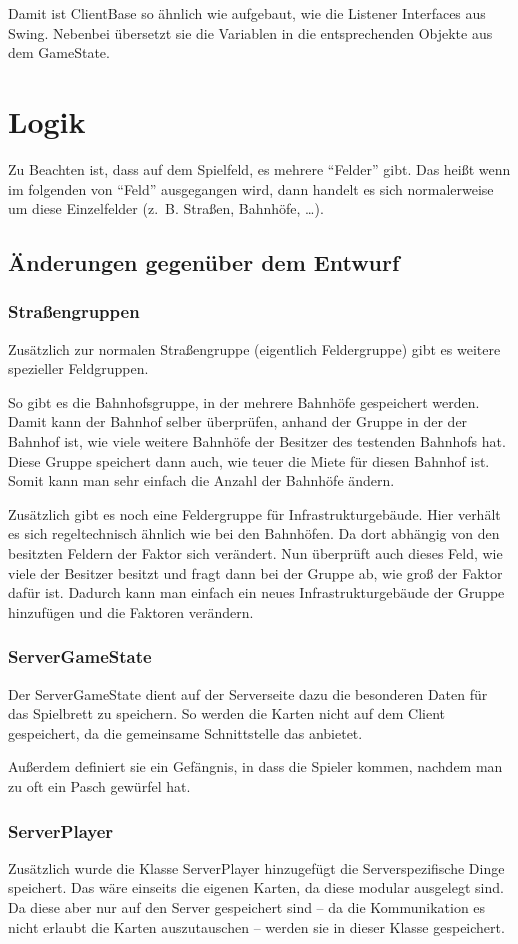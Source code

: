 \documentclass[a4paper,10pt]{article}
\begin{document}
Damit ist ClientBase so ähnlich wie aufgebaut, wie die Listener Interfaces aus Swing. Nebenbei übersetzt sie die Variablen in die entsprechenden Objekte aus dem GameState.
\newpage
\section{Logik}
Zu Beachten ist, dass auf dem Spielfeld, es mehrere ``Felder'' gibt. Das heißt wenn im folgenden von ``Feld'' ausgegangen wird, dann handelt es sich normalerweise um diese Einzelfelder (z.~B. Straßen, Bahnhöfe, \dots).
\subsection {Änderungen gegenüber dem Entwurf}
\subsubsection{Straßengruppen}
Zusätzlich zur normalen Straßengruppe (eigentlich Feldergruppe) gibt es weitere spezieller Feldgruppen.

So gibt es die Bahnhofsgruppe, in der mehrere Bahnhöfe gespeichert werden. Damit kann der Bahnhof selber überprüfen, anhand der Gruppe in der der Bahnhof ist, wie viele weitere Bahnhöfe der Besitzer des testenden Bahnhofs hat. Diese Gruppe speichert dann auch, wie teuer die Miete für diesen Bahnhof ist. Somit kann man sehr einfach die Anzahl der Bahnhöfe ändern.

Zusätzlich gibt es noch eine Feldergruppe für Infrastrukturgebäude. Hier verhält es sich regeltechnisch ähnlich wie bei den Bahnhöfen. Da dort abhängig von den besitzten Feldern der Faktor sich verändert. Nun überprüft auch dieses Feld, wie viele der Besitzer besitzt und fragt dann bei der Gruppe ab, wie groß der Faktor dafür ist. Dadurch kann man einfach ein neues Infrastrukturgebäude der Gruppe hinzufügen und die Faktoren verändern.
\subsubsection{ServerGameState}
Der ServerGameState dient auf der Serverseite dazu die besonderen Daten für das Spielbrett zu speichern. So werden die Karten nicht auf dem Client gespeichert, da die gemeinsame Schnittstelle das anbietet.

Außerdem definiert sie ein Gefängnis, in dass die Spieler kommen, nachdem man zu oft ein Pasch gewürfel hat.

\subsubsection{ServerPlayer}
Zusätzlich wurde die Klasse ServerPlayer hinzugefügt die Serverspezifische Dinge speichert. Das wäre einseits die eigenen Karten, da diese modular ausgelegt sind. Da diese aber nur auf den Server gespeichert sind -- da die Kommunikation es nicht erlaubt die Karten auszutauschen -- werden sie in dieser Klasse gespeichert.
\end{document}

